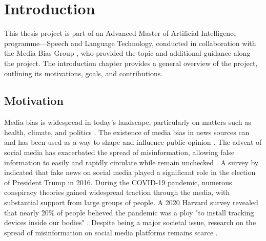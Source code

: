 \chapter{Introduction}
\label{cha:1}

This thesis project is part of an Advanced Master of Artificial Intelligence programme—Speech and Language Technology, conducted in collaboration with the Media Bias Group \cite{media-bias-group}, who provided the topic and additional guidance along the project. The introduction chapter provides a general overview of the project, outlining its motivations, goals, and contributions.


\section{Motivation}

Media bias is widespread in today's landscape, particularly on matters such as health, climate, and politics \cite{suarez-2021-prevalence-health-misinformation,wang-2024-health-misinformation,fleming-2023-climate-disinformation,tiedemann-2024-misinformation-democracy}. The existence of media bias in news sources can and has been used as a way to shape and influence public opinion \cite{aires-2020-information}. The advent of social media has exacerbated the spread of misinformation, allowing false information to easily and rapidly circulate while remain unchecked \cite{froehlich-2024-misinformation}. A survey by \cite{allcott-2017-fake-news-election} indicated that fake news on social media played a significant role in the election of President Trump in 2016. During the COVID-19 pandemic, numerous conspiracy theories gained widespread traction through the media, with substantial support from large groups of people. A 2020 Harvard survey revealed that nearly 20\% of people believed the pandemic was a ploy "to install tracking devices inside our bodies" \cite{enders-2020-covid19-misinformation}. Despite being a major societal issue, research on the spread of misinformation on social media platforms remains scarce \cite{muhammed-2022-disaster-of-misinformation}.


